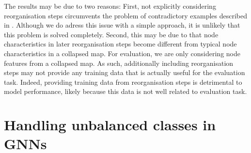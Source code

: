 \documentclass[
	fontsize=10pt, %
	twoside=true, %
	secnumdepth=1, %
  toc=indentunnumbered %
]{kaobook}
\begin{document}
The results may be due to two reasons: First, not
explicitly considering reorganisation steps circumvents the problem of
contradictory examples described in . Although we do adress
this issue with a simple approach, it is unlikely that this problem is solved
completely. Second, this may be due to that node characteristics in later
reorganisation steps become different from typical node characteristics in a
collapsed map. For evaluation, we are only considering node features from a
collapsed map. As such, additionally including reorganisation steps may not
provide any training data that is actually useful for the evaluation task.
Indeed, providing training data from reorganisation steps is detrimental to
model performance, likely because this data is not well related to evaluation
task.






\section{Handling unbalanced classes in GNNs}



\end{document}

